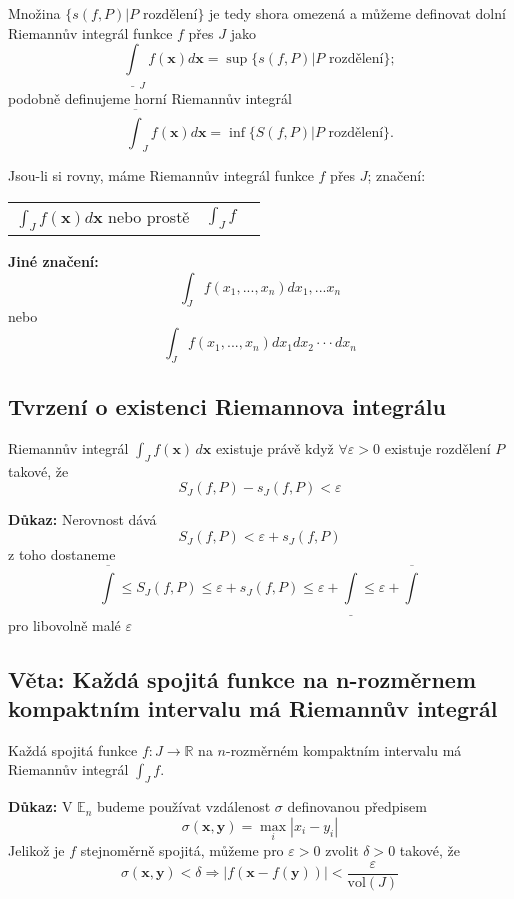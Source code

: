 \documentclass[../main.tex]{subfiles}
\begin{document}
Množina $\{s(f,P) | P \text{ rozdělení}\}$ je tedy shora omezená a můžeme definovat dolní Riemannův integrál funkce $f$ přes $J$ jako
\[\underline{\int}_J f(\textbf{x})d\textbf{x} = \sup\{s(f,P) | P \text{ rozdělení}\};\]
podobně definujeme horní Riemannův integrál
\[\overline{\int}_J f(\textbf{x})d\textbf{x} = \inf\{S(f,P) | P \text{ rozdělení}\}.\]

Jsou-li si rovny, máme Riemannův integrál funkce $f$ přes $J$; značení:
\begin{center}
\begin{tabular}{c c c}
    $\int_J f(\textbf{x})d\textbf{x}$ nebo prostě & $\int_J f $\\
\end{tabular}
\end{center}

\textbf{Jiné značení:}
\[\int_J f(x_1,...,x_n)dx_1,...x_n\]
nebo
\[\int_J f(x_1,...,x_n)dx_1 dx_2\cdot \cdot \cdot dx_n\]

\subsection{Tvrzení o existenci Riemannova integrálu}
\hspace{1.2mm}
Riemannův integrál $\int_{J} f(\mathbf{x}) \,d\mathbf{x}$ existuje právě když
$\forall \varepsilon > 0$ existuje rozdělení $P$ takové, že
\[ S_J(f,P) - s_J(f,P) < \varepsilon \]

\vspace{5mm}
\noindent
\textbf{Důkaz:}
Nerovnost dává \[ S_J(f,P) < \varepsilon + s_J(f,P) \]
z toho dostaneme
\[ \overline{\int} \leq S_J(f,P) \leq \varepsilon + s_J(f,P) \leq \varepsilon + \underline{\int} \leq
\varepsilon + \overline{\int}\]
pro libovolně malé $\varepsilon$

\subsection{Věta: Každá spojitá funkce na n-rozměrnem kompaktním intervalu má Riemannův integrál}
\hspace{1.2mm}
Každá spojitá funkce $f: J \to \mathbb{R}$ na $n$-rozměrném kompaktním intervalu má Riemannův integrál
$\int_{J}f$.

\vspace{5mm}
\noindent
\textbf{Důkaz:}
V $\mathbb{E}_n$ budeme používat vzdálenost $\sigma$ definovanou předpisem
\[ \sigma (\mathbf{x}, \mathbf{y}) = \max_{i} |x_i - y_i| \]
Jelikož je $f$ stejnoměrně spojitá, můžeme pro $\varepsilon > 0$ zvolit $\delta > 0$ takové, že
\[ \sigma (\mathbf{x}, \mathbf{y}) < \delta \Rightarrow
|f(\mathbf{x} - f(\mathbf{y}))| < \frac{\varepsilon}{\textrm{vol}(J)} \]
\end{document}
